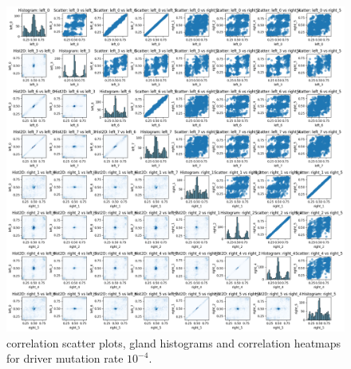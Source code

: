 \begin{figure}[h]
    \centering
    \includegraphics[width=\textwidth]{Chapter_methylation/figures/sensitivity_driver2.png}
    \caption{correlation scatter plots, gland histograms and correlation heatmaps for driver mutation rate $10^{-4}$.}
    \label{fig:sensitivity_driver2}
\end{figure}
\clearpage
